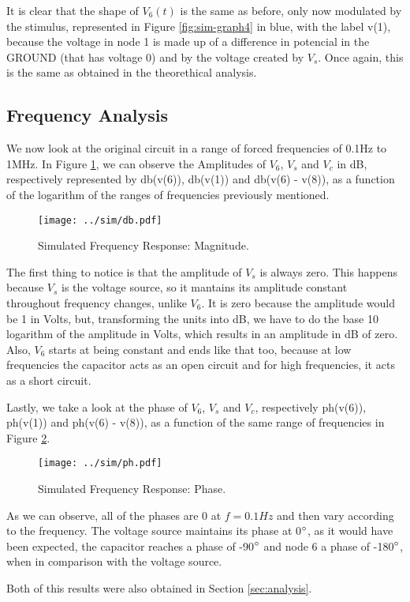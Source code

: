 It is clear that the shape of $V_6(t)$ is the same as before, only now modulated by the stimulus, represented in Figure \ref{fig:sim-graph4} in blue, with the label v(1), because the voltage in node 1 is made up of a difference in potencial in the GROUND (that has voltage 0) and by the voltage created by $V_s$. Once again, this is the same as obtained in the theorethical analysis.

\subsection{Frequency Analysis}
\label{subsec:sim_freq}

We now look at the original circuit in a range of forced frequencies of 0.1Hz to 1MHz. In Figure \ref{fig:sim_db}, we can observe the Amplitudes of $V_6$, $V_s$ and $V_c$ in dB, respectively represented by db(v(6)), db(v(1)) and db(v(6) - v(8)), as a function of the logarithm of the ranges of frequencies previously mentioned.

\begin{figure}[H] \centering
\texttt{[image: ../sim/db.pdf]}
\caption{Simulated Frequency Response: Magnitude.}
\label{fig:sim_db}
\end{figure}

The first thing to notice is that the amplitude of $V_s$ is always zero. This happens because $V_s$ is the voltage source, so it mantains its amplitude constant throughout frequency changes, unlike $V_6$. It is zero because the amplitude would be 1 in Volts, but, transforming the units into dB, we have to do the base 10 logarithm of the amplitude in Volts, which results in an amplitude in dB of zero. Also, $V_6$ starts at being constant and ends like that too, because at low frequencies the capacitor acts as an open circuit and for high frequencies, it acts as a short circuit.
\par
Lastly, we take a look at the phase of $V_6$, $V_s$ and $V_c$, respectively ph(v(6)), ph(v(1)) and ph(v(6) - v(8)), as a function of the same range of frequencies in Figure \ref{fig:sim_ph}.

\begin{figure}[H] \centering
\texttt{[image: ../sim/ph.pdf]}
\caption{Simulated Frequency Response: Phase.}
\label{fig:sim_ph}
\end{figure}


As we can observe, all of the phases are 0 at $f=0.1Hz$ and then vary according to the frequency. The voltage source maintains its phase at 0$\degree$, as it would have been expected, the capacitor reaches a phase of -90$\degree$ and node 6 a phase of -180$\degree$, when in comparison with the voltage source.
\par
Both of this results were also obtained in Section \ref{sec:analysis}.











